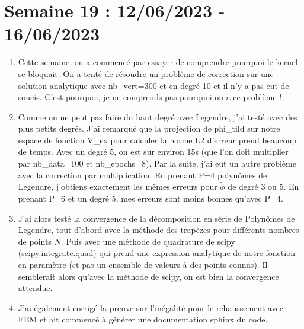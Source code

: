 \documentclass[french]{article}
\begin{document}
\section{Semaine 19 : 12/06/2023 - 16/06/2023}
	\noindent
	\begin{enumerate}[label=\textbullet]
		\item Cette semaine, on a commencé par essayer de comprendre pourquoi le kernel se bloquait. On a tenté de résoudre un problème de correction sur une solution analytique avec nb\_vert=300 et en degré 10 et il n'y a pas eut de soucis. C'est pourquoi, je ne comprends pas pourquoi on a ce problème !
		\item Comme on ne peut pas faire du haut degré avec Legendre, j'ai testé avec des plus petits degrés. J'ai remarqué que la projection de phi\_tild sur notre espace de fonction V\_ex pour calculer la norme L2 d'erreur prend beaucoup de temps. Avec un degré 5, on est sur environ 15s (que l'on doit multiplier par nb\_data=100 et nb\_epochs=8). Par la suite, j'ai eut un autre problème avec la correction par multiplication. En prenant P=4 polynômes de Legendre, j'obtiens exactement les mêmes erreurs pour $\tilde{\phi}$ de degré 3 ou 5. En prenant P=6 et un degré 5, mes erreurs sont moins bonnes qu'avec P=4.
		\item J'ai alors testé la convergence de la décomposition en série de Polynômes de Legendre, tout d'abord avec la méthode des trapèzes pour différents nombres de points $N$. Puis avec une méthode de quadrature de scipy (\href{https://docs.scipy.org/doc/scipy/reference/generated/scipy.integrate.quad.html#scipy.integrate.quad}{scipy.integrate.quad}) qui prend une expression analytique de notre fonction en paramètre (et pas un ensemble de valeurs à des points connus). Il semblerait alors qu'avec la méthode de scipy, on est bien la convergence attendue.
		\item J'ai également corrigé la preuve sur l'inégalité pour le rehaussement avec FEM et ait commencé à générer une documentation sphinx du code.
	\end{enumerate}
\end{document}
